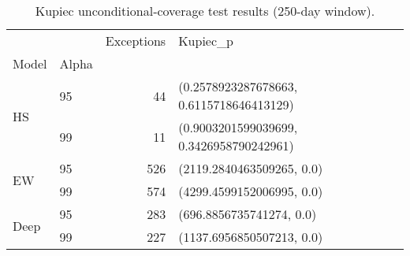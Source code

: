 \begin{table}
\caption{Kupiec unconditional‐coverage test results (250-day window).}
\label{tab:kupiec}
\begin{tabular}{llrl}
\toprule
 &  & Exceptions & Kupiec_p \\
Model & Alpha &  &  \\
\midrule
\multirow[t]{2}{*}{HS} & 95 & 44 & (0.2578923287678663, 0.6115718646413129) \\
 & 99 & 11 & (0.9003201599039699, 0.3426958790242961) \\
\cline{1-4}
\multirow[t]{2}{*}{EW} & 95 & 526 & (2119.2840463509265, 0.0) \\
 & 99 & 574 & (4299.4599152006995, 0.0) \\
\cline{1-4}
\multirow[t]{2}{*}{Deep} & 95 & 283 & (696.8856735741274, 0.0) \\
 & 99 & 227 & (1137.6956850507213, 0.0) \\
\cline{1-4}
\bottomrule
\end{tabular}
\end{table}
